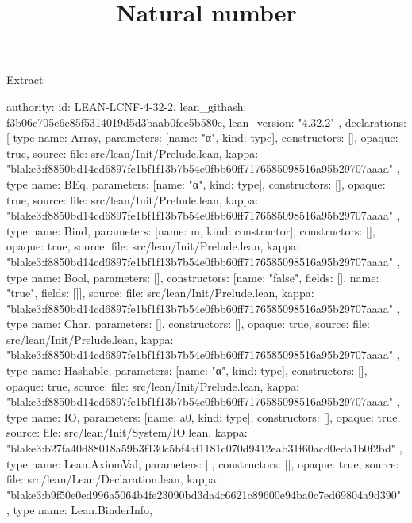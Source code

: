 \begin{lexlean}{Extract}
\title{Natural number}
\begin{toolingmodule}
{
  authority: {
    id: LEAN-LCNF-4-32-2,
    lean_githash: f3b06c705e6c85f5314019d5d3baab0fec5b580c,
    lean_version: "4.32.2"
  },
  declarations: [
    type{
      name: Array,
      parameters: [{name: "α", kind: type{}}],
      constructors: [],
      opaque: true,
      source: {
        file: src/lean/Init/Prelude.lean,
        kappa: "blake3:f8850bd14cd6897fe1bf1f13b7b54e0fbb60ff7176585098516a95b29707aaaa"
      }
    },
    type{
      name: BEq,
      parameters: [{name: "α", kind: type{}}],
      constructors: [],
      opaque: true,
      source: {
        file: src/lean/Init/Prelude.lean,
        kappa: "blake3:f8850bd14cd6897fe1bf1f13b7b54e0fbb60ff7176585098516a95b29707aaaa"
      }
    },
    type{
      name: Bind,
      parameters: [{name: m, kind: constructor{}}],
      constructors: [],
      opaque: true,
      source: {
        file: src/lean/Init/Prelude.lean,
        kappa: "blake3:f8850bd14cd6897fe1bf1f13b7b54e0fbb60ff7176585098516a95b29707aaaa"
      }
    },
    type{
      name: Bool,
      parameters: [],
      constructors: [{name: "false", fields: []}, {name: "true", fields: []}],
      source: {
        file: src/lean/Init/Prelude.lean,
        kappa: "blake3:f8850bd14cd6897fe1bf1f13b7b54e0fbb60ff7176585098516a95b29707aaaa"
      }
    },
    type{
      name: Char,
      parameters: [],
      constructors: [],
      opaque: true,
      source: {
        file: src/lean/Init/Prelude.lean,
        kappa: "blake3:f8850bd14cd6897fe1bf1f13b7b54e0fbb60ff7176585098516a95b29707aaaa"
      }
    },
    type{
      name: Hashable,
      parameters: [{name: "α", kind: type{}}],
      constructors: [],
      opaque: true,
      source: {
        file: src/lean/Init/Prelude.lean,
        kappa: "blake3:f8850bd14cd6897fe1bf1f13b7b54e0fbb60ff7176585098516a95b29707aaaa"
      }
    },
    type{
      name: IO,
      parameters: [{name: a0, kind: type{}}],
      constructors: [],
      opaque: true,
      source: {
        file: src/lean/Init/System/IO.lean,
        kappa: "blake3:b27fa40d88018a59b3f130c5bf4af1181c070d9412eab31f60acd0eda1b0f2bd"
      }
    },
    type{
      name: Lean.AxiomVal,
      parameters: [],
      constructors: [],
      opaque: true,
      source: {
        file: src/lean/Lean/Declaration.lean,
        kappa: "blake3:b9f50e0ed996a5064b4fe23090bd3da4c6621c89600e94ba0c7ed69804a9d390"
      }
    },
    type{
      name: Lean.BinderInfo,
}}
\end{toolingmodule}
\end{lexlean}
